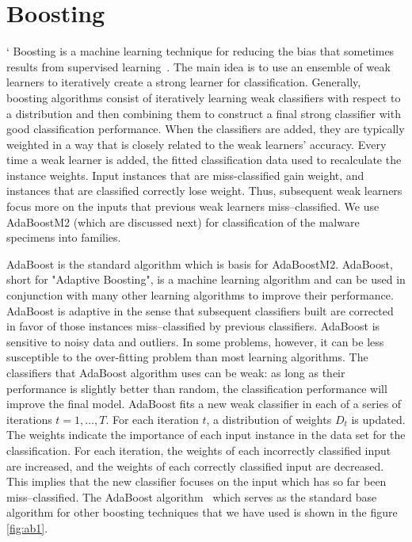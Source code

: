 \section{Boosting}
\label{Boosting}
`
Boosting is a machine learning technique for reducing the bias that
sometimes results from supervised learning~\cite{3}. The main idea is
to use an ensemble of weak learners to iteratively create a strong learner for
classification. Generally, boosting
algorithms consist of iteratively learning weak classifiers with
respect to a distribution and then combining them to construct a final
strong classifier with good classification performance. When the classifiers are
added, they are typically weighted in a way that is closely related
to the weak learners' accuracy. Every time a weak learner is added,
the fitted classification data used to recalculate the instance weights.
Input instances that are miss-classified gain weight,
and instances that are classified correctly lose weight. Thus, subsequent
weak learners focus more on the inputs that previous weak learners
miss--classified. We use AdaBoostM2 (which are discussed next) 
for classification of the malware specimens into families.

AdaBoost is the standard algorithm which is basis for AdaBoostM2.
AdaBoost, short for "Adaptive Boosting", is a machine
learning algorithm and can be used in conjunction with many other
learning algorithms to improve their performance. AdaBoost is adaptive
in the sense that subsequent classifiers built are corrected in favor
of those instances miss--classified by previous classifiers. AdaBoost is
sensitive to noisy data and outliers. In some problems, however, it
can be less susceptible to the over-fitting problem than most learning
algorithms. The classifiers that AdaBoost algorithm uses can be weak:
as long as their performance is slightly better than random, the
classification performance will improve the final model. AdaBoost
fits a new weak classifier in each of a series
of iterations $t=1,\ldots,T$. For each iteration $t$, a distribution of weights
$D_{t}$ is updated. The weights indicate the importance of each input instance
in the data set for the classification. For each iteration, the
weights of each incorrectly classified input are increased, and the
weights of each correctly classified input are decreased. This implies
that the new classifier focuses on the input which has so far been
miss--classified. The AdaBoost algorithm~\cite{4} which serves as the standard
base algorithm for other boosting techniques that we have used is
shown in the figure \ref{fig:ab1}.

